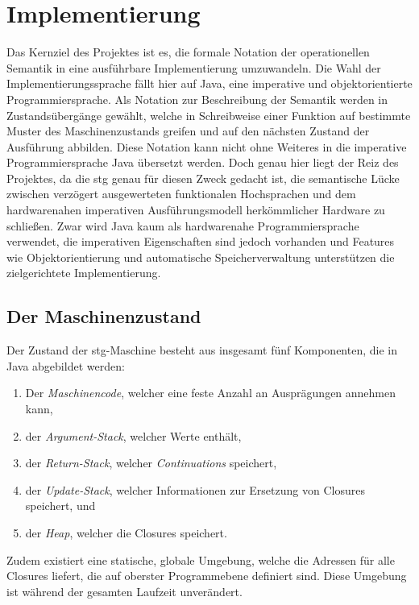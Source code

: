 
\chapter{Implementierung}\label{chap:implementierung}

Das Kernziel des Projektes ist es, die formale Notation der operationellen Semantik in eine ausführbare Implementierung umzuwandeln.
Die Wahl der Implementierungssprache fällt hier auf Java, eine imperative und objektorientierte Programmiersprache.
Als Notation zur Beschreibung der Semantik werden in~\cite{Jones_StockHardwareSTG} Zustandsübergänge gewählt, welche in Schreibweise einer Funktion auf bestimmte Muster des Maschinenzustands greifen und auf den nächsten Zustand der Ausführung abbilden.
Diese Notation kann nicht ohne Weiteres in die imperative Programmiersprache Java übersetzt werden.
Doch genau hier liegt der Reiz des Projektes, da die \gls{stg} genau für diesen Zweck gedacht ist, die semantische Lücke zwischen verzögert ausgewerteten funktionalen Hochsprachen und dem hardwarenahen imperativen Ausführungsmodell herkömmlicher Hardware zu schließen.
Zwar wird Java kaum als hardwarenahe Programmiersprache verwendet, die imperativen Eigenschaften sind jedoch vorhanden und Features wie Objektorientierung und automatische Speicherverwaltung unterstützen die zielgerichtete Implementierung.

\section{Der Maschinenzustand}

Der Zustand der \gls{stg}-Maschine besteht aus insgesamt fünf Komponenten, die in Java abgebildet werden:

\begin{enumerate}
\item Der \textit{Maschinencode}, welcher eine feste Anzahl an Ausprägungen annehmen kann,
\item der \textit{Argument-Stack}, welcher Werte enthält,
\item der \textit{Return-Stack}, welcher \textit{Continuations} speichert,
\item der \textit{Update-Stack}, welcher Informationen zur Ersetzung von Closures speichert, und
\item der \textit{Heap}, welcher die Closures speichert.
\end{enumerate}

Zudem existiert eine statische, globale Umgebung, welche die Adressen für alle Closures liefert, die auf oberster Programmebene definiert sind.
Diese Umgebung ist während der gesamten Laufzeit unverändert.

